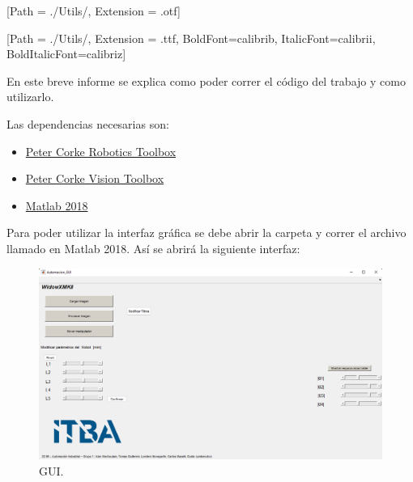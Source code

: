 



\def\verObs{0}


\setmainfont{AvenirLTStd-Roman}[Path = ./Utils/, Extension = .otf]



\setmainfont{calibri-regular}[Path = ./Utils/, Extension = .ttf, BoldFont=calibrib, ItalicFont=calibrii, BoldItalicFont=calibriz]


En este breve informe se explica como poder correr el código del trabajo y como utilizarlo.

Las dependencias necesarias son:
\begin{itemize}
\item \href{https://petercorke.com/toolboxes/robotics-toolbox/}{Peter Corke Robotics Toolbox}
\item \href{https://petercorke.com/toolboxes/machine-vision-toolbox/}{Peter Corke Vision Toolbox}
\item \href{https://la.mathworks.com/products/matlab.html}{Matlab 2018}
\end{itemize}

Para poder utilizar la interfaz gráfica se debe abrir la carpeta  y correr el archivo llamado  en Matlab 2018. Así se abrirá la siguiente interfaz:
\begin{figure}[H]
	\centering
	\includegraphics[width=\linewidth]{GUI}
	\caption{GUI.}	
	\label{fig:GUI}
\end{figure}

